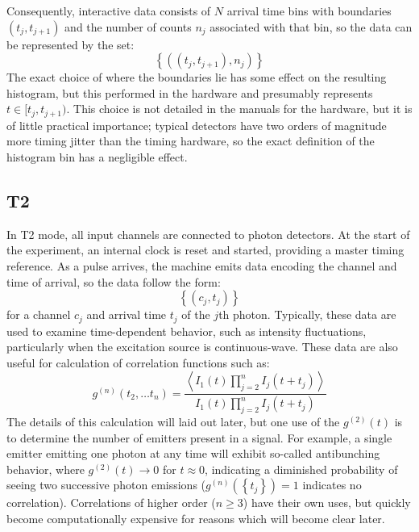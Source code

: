 \documentclass{book}
\newcommand{\braces}[1]{\ensuremath{\left\lbrace #1 \right\rbrace}}
\newcommand{\angles}[1]{\ensuremath{\left\langle #1 \right\rangle}}
\begin{document}
Consequently, interactive data consists of $N$ arrival time bins with boundaries $(t_{j}, t_{j+1})$ and the number of counts $n_{j}$ associated with that bin, so the data can be represented by the set:
\begin{equation}
\braces{((t_{j}, t_{j+1}), n_{j})}
\end{equation}
The exact choice of where the boundaries lie has some effect on the resulting histogram, but this performed in the hardware and presumably represents $t\in[t_{j}, t_{j+1})$. This choice is not detailed in the manuals for the hardware, but it is of little practical importance; typical detectors have two orders of magnitude more timing jitter than the timing hardware, so the exact definition of the histogram bin has a negligible effect.

\subsection{T2}
In T2 mode, all input channels are connected to photon detectors. At the start of the experiment, an internal clock is reset and started, providing a master timing reference. As a pulse arrives, the machine emits data encoding the channel and time of arrival, so the data follow the form:
\begin{equation}
\braces{(c_{j}, t_{j})}
\end{equation}
for a channel $c_{j}$ and arrival time $t_{j}$ of the $j$th photon. Typically, these data are used to examine time-dependent behavior, such as intensity fluctuations, particularly when the excitation source is continuous-wave. These data are also useful for calculation of correlation functions such as:
\begin{equation}
g^{(n)}(t_{2}, \ldots t_{n}) = \frac
	{\angles{I_{1}(t)\prod_{j=2}^{n}{I_{j}(t+t_{j})}}}
	{I_{1}(t)\prod_{j=2}^{n}{I_{j}(t+t_{j})}}
\end{equation}
The details of this calculation will laid out later, but one use of the $g^{(2)}(t)$ is to determine the number of emitters present in a signal. For example, a single emitter emitting one photon at any time will exhibit so-called antibunching behavior, where $g^{(2)}(t)\rightarrow 0$ for $t\approx 0$, indicating a diminished probability of seeing two successive photon emissions ($g^{(n)}(\braces{t_{j}})=1$ indicates no correlation). Correlations of higher order ($n\ge 3$) have their own uses, but quickly become computationally expensive for reasons which will become clear later.
\end{document}
